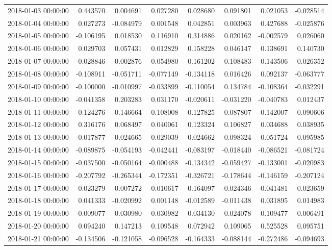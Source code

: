 \begin{tabular}{lrrrrrrr}
2018-01-03 00:00:00 & 0.443570 & 0.004691 & 0.027280 & 0.028680 & 0.091801 & 0.021053 & -0.028514 \\
2018-01-04 00:00:00 & 0.027273 & -0.084979 & 0.001548 & 0.042851 & 0.003963 & 0.427688 & -0.025876 \\
2018-01-05 00:00:00 & -0.106195 & 0.018530 & 0.116910 & 0.314886 & 0.020162 & -0.002579 & 0.026060 \\
2018-01-06 00:00:00 & 0.029703 & 0.057431 & 0.012829 & 0.158228 & 0.046147 & 0.138691 & 0.140730 \\
2018-01-07 00:00:00 & -0.028846 & 0.002876 & -0.054980 & 0.161202 & 0.108483 & 0.143506 & -0.026352 \\
2018-01-08 00:00:00 & -0.108911 & -0.051711 & -0.077149 & -0.134118 & 0.016426 & 0.092137 & -0.063777 \\
2018-01-09 00:00:00 & -0.100000 & -0.010997 & -0.033899 & -0.110054 & 0.134784 & -0.108364 & -0.032291 \\
2018-01-10 00:00:00 & -0.041358 & 0.203283 & 0.031170 & -0.020611 & -0.031220 & -0.040783 & 0.012437 \\
2018-01-11 00:00:00 & -0.124276 & -0.146664 & -0.108008 & -0.127825 & -0.087807 & -0.142007 & -0.090606 \\
2018-01-12 00:00:00 & 0.316176 & 0.068497 & 0.040061 & 0.123324 & 0.106827 & 0.034688 & 0.038935 \\
2018-01-13 00:00:00 & -0.017877 & 0.024665 & 0.029039 & -0.024662 & 0.098324 & 0.051724 & 0.095985 \\
2018-01-14 00:00:00 & -0.089875 & -0.054193 & -0.042441 & -0.083197 & -0.018440 & -0.086521 & -0.081724 \\
2018-01-15 00:00:00 & -0.037500 & -0.050164 & -0.000488 & -0.134342 & -0.059427 & -0.133001 & -0.020983 \\
2018-01-16 00:00:00 & -0.207792 & -0.265344 & -0.172351 & -0.326721 & -0.178644 & -0.146159 & -0.207124 \\
2018-01-17 00:00:00 & 0.023279 & -0.007272 & -0.010617 & 0.164097 & -0.024346 & -0.041481 & 0.023659 \\
2018-01-18 00:00:00 & 0.041333 & -0.020992 & 0.001148 & -0.012589 & -0.011438 & 0.031895 & 0.014983 \\
2018-01-19 00:00:00 & -0.009077 & 0.030980 & 0.030982 & 0.034130 & 0.024078 & 0.109477 & 0.006491 \\
2018-01-20 00:00:00 & 0.094240 & 0.147213 & 0.109548 & 0.072942 & 0.109065 & 0.525528 & 0.095751 \\
2018-01-21 00:00:00 & -0.134506 & -0.121058 & -0.096528 & -0.164333 & -0.088144 & -0.272486 & -0.094693 \\

\end{tabular}
